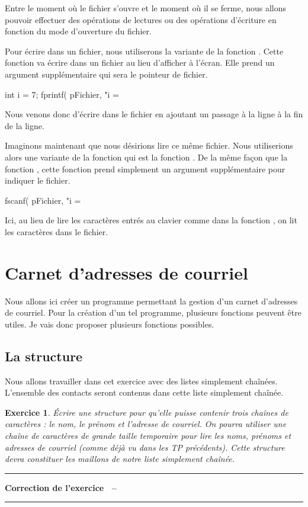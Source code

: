 \documentclass[a4paper]{article}
\newenvironment{Correction}{\par\tiny\blue\rule[1ex]{\textwidth}{1pt}\par\normalsize\textbf{Correction de l'exercice~\theExo{} -- }}{\par\tiny\blue\rule[1ex]{\textwidth}{1pt}\par}
\newtheorem{Exo}{Exercice}
\begin{document}
		Entre le moment où le fichier s'ouvre et le moment où il se ferme, nous allons pouvoir effectuer des opérations de lectures ou des opérations d'écriture en fonction du mode d'ouverture du fichier.

		Pour écrire dans un fichier, nous utiliserons la variante  de la fonction .
		Cette fonction va écrire dans un fichier au lieu d'afficher à l'écran.
		Elle prend un argument supplémentaire qui sera le pointeur de fichier.
		\begin{Code*}
int i = 7;
fprintf( pFichier, "i = %
		\end{Code*}
		Nous venons donc d'écrire  dans le fichier en ajoutant un passage à la ligne à la fin de la ligne.

		Imaginons maintenant que nous désirions lire ce même fichier.
		Nous utiliserions alors une variante de la fonction  qui est la fonction .
		De la même façon que la fonction , cette fonction prend simplement un argument supplémentaire pour indiquer le fichier.
		\begin{Code*}
fscanf( pFichier, "i = %
		\end{Code*}
		Ici, au lieu de lire les caractères entrés au clavier comme dans la fonction , on lit les caractères dans le fichier.
	\section{Carnet d'adresses de courriel}
		Nous allons ici créer un programme permettant la gestion d'un carnet d'adresses de courriel.
		Pour la création d'un tel programme, plusieurs fonctions peuvent être utiles.
		Je vais donc proposer plusieurs fonctions possibles.
		\subsection{La structure}
			Nous allons travailler dans cet exercice avec des listes simplement chaînées.
			L'ensemble des contacts seront contenus dans cette liste simplement chaînée.
			\begin{Exo}
				Écrire une structure pour qu'elle puisse contenir trois chaînes de caractères : le nom, le prénom et l'adresse de courriel.
				On pourra utiliser une chaîne de caractères de grande taille temporaire pour lire les noms, prénoms et adresses de courriel (comme déjà vu dans les TP précédents).
				Cette structure devra constituer les maillons de notre liste simplement chaînée.
			\end{Exo}
			\begin{Correction}
			\end{Correction}
\end{document}
